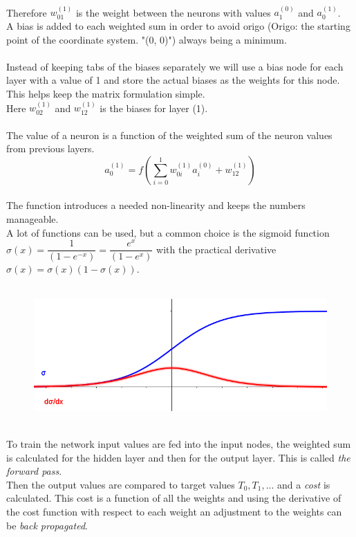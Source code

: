 \documentclass{article}
\begin{document}
\\
Therefore $w_{01}^{(1)}$ is the weight between the neurons with values $a_1^{(0)}$ and $a_0^{(1)}$.
\\
A bias is added to each weighted sum in order to avoid origo (Origo: the starting point of the coordinate system. "(0, 0)") always being a minimum.
\\
\\
Instead of keeping tabs of the biases separately we will use a bias node for each layer with a value of 1 and store the actual biases as the weights for this node. This helps keep the matrix formulation simple.
\\
Here $w_{02}^{(1)}$ and $w_{12}^{(1)}$ is the biases for layer (1).
\\
\\
The value of a neuron is a function of the weighted sum of the neuron values from previous layers. $$a_0^{(1)} = f(\sum_{i=0}^{1}{w_{0i}^{(1)}a_i^{(0)}}+w_{12}^{(1)})$$
\\
The function introduces a needed non-linearity and keeps the numbers manageable.
\\
A lot of functions can be used, but a common choice is the sigmoid function $\sigma(x) = \dfrac{1}{(1-e^{-x})} = \dfrac{e^{x}}{(1-e^{x})}$ with the practical derivative $\sigma(x) = \sigma(x)(1 - \sigma(x)) $.
\\
\\
\begin{figure}[h]
\includegraphics[scale=.5]{sigmoid}
\centering
\end{figure}
\\
To train the network input values are fed into the input nodes, the weighted sum is calculated for the hidden layer and then for the output layer. This is called \textit{the forward pass}.
\\
Then the output values are compared to target values $T_0, T_1, ...$ and a \textit{cost} is calculated. This cost is a function of all the weights and using the derivative of the cost function with respect to each weight an adjustment to the weights can be \textit{back propagated}.
\\
\end{document}
